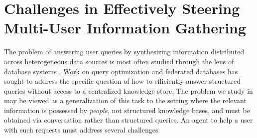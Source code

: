 \section{Challenges in Effectively Steering Multi-User Information Gathering}

The problem of answering user queries by synthesizing information distributed across heterogeneous data sources is most often studied through the lens of database systems \cite{zaniolo1997advanced}.
Work on query optimization and federated databases \cite{sheth1990federated} has sought to address the 
specific question of how to efficiently answer structured queries without access to a centralized knowledge store. 
The problem we study in \asyncfw{} may be viewed as a generalization of this task to the setting where the relevant information is possessed by \emph{people}, not structured knowledge bases, and must be obtained via conversation rather than structured queries.
An agent to help a user with such requests must address several challenges:

